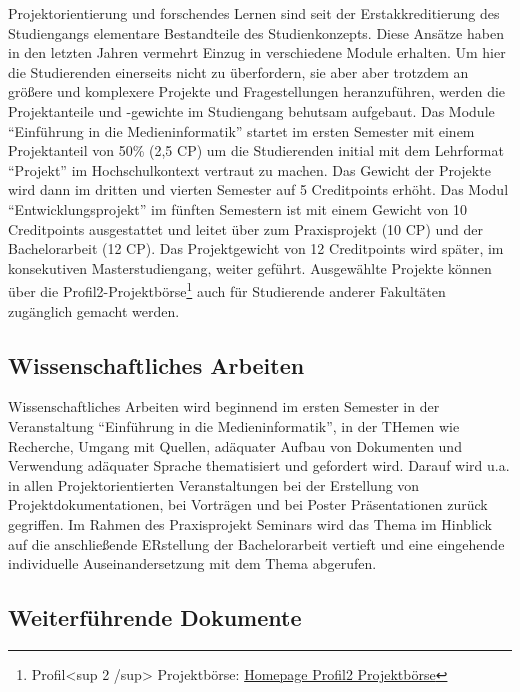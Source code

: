Projektorientierung und forschendes Lernen sind seit der
Erstakkreditierung des Studiengangs elementare Bestandteile des
Studienkonzepts. Diese Ansätze haben in den letzten Jahren vermehrt
Einzug in verschiedene Module erhalten. Um hier die Studierenden
einerseits nicht zu überfordern, sie aber aber trotzdem an größere und
komplexere Projekte und Fragestellungen heranzuführen, werden die
Projektanteile und -gewichte im Studiengang behutsam aufgebaut. Das
Module ``Einführung in die Medieninformatik'' startet im ersten Semester
mit einem Projektanteil von 50\% (2,5 CP) um die Studierenden initial
mit dem Lehrformat ``Projekt'' im Hochschulkontext vertraut zu machen.
Das Gewicht der Projekte wird dann im dritten und vierten Semester auf 5
Creditpoints erhöht. Das Modul ``Entwicklungsprojekt'' im fünften
Semestern ist mit einem Gewicht von 10 Creditpoints ausgestattet und
leitet über zum Praxisprojekt (10 CP) und der Bachelorarbeit (12 CP).
Das Projektgewicht von 12 Creditpoints wird später, im konsekutiven
Masterstudiengang, weiter geführt. Ausgewählte Projekte können über die
Profil2-Projektbörse\footnote{Profil\textless{}sup 2 /sup\textgreater{}
  Projektbörse:
  \href{http://projektboerse-profil2.th-koeln.de/}{Homepage Profil2
  Projektbörse}} auch für Studierende anderer Fakultäten zugänglich
gemacht werden.

\subsection{Wissenschaftliches
Arbeiten}\label{wissenschaftliches-arbeiten}

Wissenschaftliches Arbeiten wird beginnend im ersten Semester in der
Veranstaltung ``Einführung in die Medieninformatik'', in der THemen wie
Recherche, Umgang mit Quellen, adäquater Aufbau von Dokumenten und
Verwendung adäquater Sprache thematisiert und gefordert wird. Darauf
wird u.a. in allen Projektorientierten Veranstaltungen bei der
Erstellung von Projektdokumentationen, bei Vorträgen und bei Poster
Präsentationen zurück gegriffen. Im Rahmen des Praxisprojekt Seminars
wird das Thema im Hinblick auf die anschließende ERstellung der
Bachelorarbeit vertieft und eine eingehende individuelle
Auseinandersetzung mit dem Thema abgerufen.

\subsection{Weiterführende
Dokumente}\label{weiterfuxfchrende-dokumente-3}

